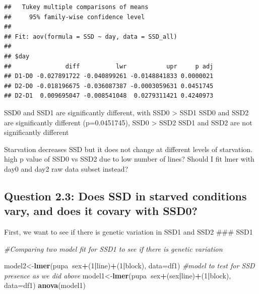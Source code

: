 \documentclass[
]{article}
\newenvironment{Shaded}{\begin{snugshade}}{\end{snugshade}}
\newcommand{\CommentTok}[1]{\textcolor[rgb]{0.56,0.35,0.01}{\textit{#1}}}
\newcommand{\DataTypeTok}[1]{\textcolor[rgb]{0.13,0.29,0.53}{#1}}
\newcommand{\DecValTok}[1]{\textcolor[rgb]{0.00,0.00,0.81}{#1}}
\newcommand{\KeywordTok}[1]{\textcolor[rgb]{0.13,0.29,0.53}{\textbf{#1}}}
\newcommand{\NormalTok}[1]{#1}
\newcommand{\OperatorTok}[1]{\textcolor[rgb]{0.81,0.36,0.00}{\textbf{#1}}}
\begin{document}
\begin{verbatim}
##   Tukey multiple comparisons of means
##     95% family-wise confidence level
## 
## Fit: aov(formula = SSD ~ day, data = SSD_all)
## 
## $day
##               diff          lwr           upr     p adj
## D1-D0 -0.027891722 -0.040899261 -0.0148841833 0.0000021
## D2-D0 -0.018196675 -0.036087387 -0.0003059631 0.0451745
## D2-D1  0.009695047 -0.008541048  0.0279311421 0.4240973
\end{verbatim}

SSD0 and SSD1 are significantly different, with SSD0 \textgreater{} SSD1
SSD0 and SSD2 are significantly different (p=0.0451745), SSD0
\textgreater{} SSD2 SSD1 and SSD2 are not significantly different

Starvation decreases SSD but it does not change at different levels of
starvation. high p value of SSD0 vs SSD2 due to low number of lines?
Should I fit lmer with day0 and day2 raw data subset instead?

\hypertarget{question-2.3-does-ssd-in-starved-conditions-vary-and-does-it-covary-with-ssd0}{%
\subsection{Question 2.3: Does SSD in starved conditions vary, and does
it covary with
SSD0?}\label{question-2.3-does-ssd-in-starved-conditions-vary-and-does-it-covary-with-ssd0}}

First, we want to see if there is genetic variation in SSD1 and SSD2
\#\#\# SSD1

\begin{Shaded}
\begin{Highlighting}[]
\CommentTok{#Comparing two model fit for SSD1 to see if there is genetic variation}

\NormalTok{model2<-}\KeywordTok{lmer}\NormalTok{(pupa}\OperatorTok{~}\NormalTok{sex}\OperatorTok{+}\NormalTok{(}\DecValTok{1}\OperatorTok{|}\NormalTok{line)}\OperatorTok{+}\NormalTok{(}\DecValTok{1}\OperatorTok{|}\NormalTok{block), }\DataTypeTok{data=}\NormalTok{df1)  }\CommentTok{#model to test for SSD presence as we did above}
\NormalTok{model1<-}\KeywordTok{lmer}\NormalTok{(pupa}\OperatorTok{~}\NormalTok{sex}\OperatorTok{+}\NormalTok{(sex}\OperatorTok{|}\NormalTok{line)}\OperatorTok{+}\NormalTok{(}\DecValTok{1}\OperatorTok{|}\NormalTok{block), }\DataTypeTok{data=}\NormalTok{df1) }
\KeywordTok{anova}\NormalTok{(model1)}
\end{Highlighting}
\end{Shaded}
\end{document}
